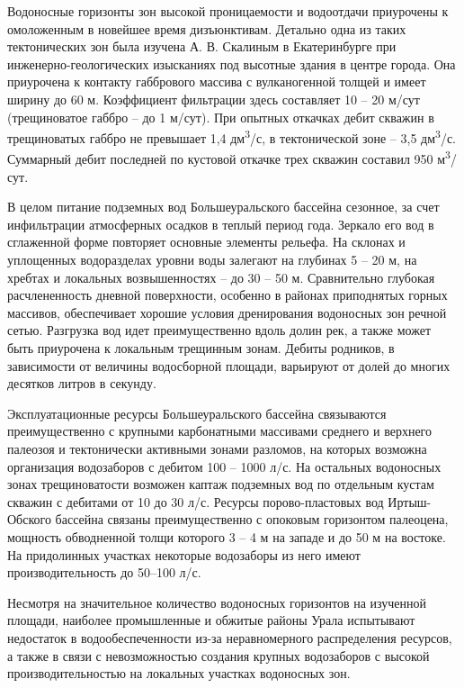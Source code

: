 Водоносные горизонты зон высокой проницаемости и водоотдачи приурочены к омоложенным в новейшее время дизъюнктивам. Детально одна из таких тектонических зон была изучена А. В. Скалиным в Екатеринбурге
при инженерно-геологических изысканиях под высотные здания в центре города. Она приурочена к контакту габбрового массива с вулканогенной толщей и имеет ширину до 60 м. Коэффициент фильтрации здесь составляет 10 – 20 м/сут (трещиноватое габбро – до 1 м/сут). При опытных откачках дебит скважин в трещиноватых габбро не превышает 1,4 дм\textsuperscript{3}/с, в тектонической зоне – 3,5 дм\textsuperscript{3}/с. Суммарный дебит последней по кустовой откачке трех скважин составил 950 м\textsuperscript{3}/сут.

В целом питание подземных вод Большеуральского бассейна сезонное, за счет инфильтрации атмосферных осадков в теплый период года. Зеркало его вод в сглаженной форме повторяет основные элементы рельефа. На склонах и уплощенных водоразделах уровни воды залегают на глубинах 5 – 20 м, на хребтах и локальных возвышенностях – до 30 – 50 м. Сравнительно глубокая расчлененность дневной поверхности, особенно в районах приподнятых горных массивов, обеспечивает хорошие условия дренирования водоносных зон речной сетью. Разгрузка вод идет преимущественно вдоль долин рек, а также может быть приурочена к локальным трещинным зонам. Дебиты родников, в зависимости от величины водосборной площади, варьируют от долей до многих десятков литров в секунду.

Эксплуатационные ресурсы Большеуральского бассейна связываются преимущественно с крупными карбонатными массивами среднего и верхнего палеозоя и тектонически активными зонами разломов, на которых возможна организация водозаборов с дебитом 100 – 1000 л/с. На остальных водоносных зонах трещиноватости возможен каптаж подземных вод по отдельным кустам скважин с дебитами от 10 до 30 л/с. Ресурсы порово-пластовых вод Иртыш-Обского бассейна связаны преимущественно с опоковым горизонтом палеоцена, мощность обводненной толщи которого 3 – 4 м на западе и до 50 м на востоке. На придолинных участках некоторые водозаборы из него имеют производительность до 50–100 л/с.

Несмотря на значительное количество водоносных горизонтов на изученной площади, наиболее промышленные и обжитые районы Урала испытывают недостаток в водообеспеченности из-за неравномерного распределения ресурсов, а также в связи с невозможностью создания крупных водозаборов с высокой производительностью на локальных участках водоносных зон.
